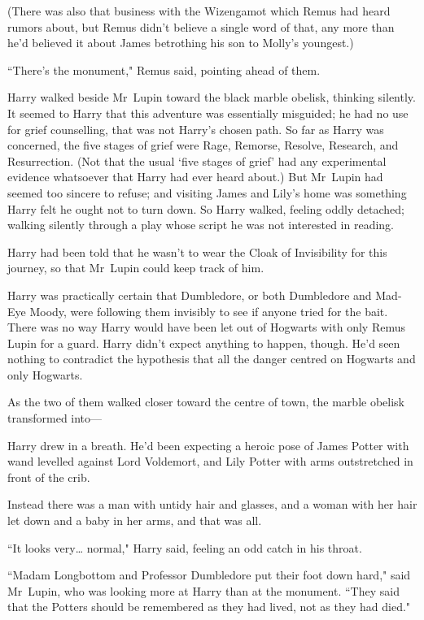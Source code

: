 (There was also that business with the Wizengamot which Remus had heard rumors about, but Remus didn't believe a single word of that, any more than he'd believed it about James betrothing his son to Molly's youngest.)

``There's the monument," Remus said, pointing ahead of them.

\later

Harry walked beside Mr~Lupin toward the black marble obelisk, thinking silently. It seemed to Harry that this adventure was essentially misguided; he had no use for grief counselling, that was not Harry's chosen path. So far as Harry was concerned, the five stages of grief were Rage, Remorse, Resolve, Research, and Resurrection. (Not that the usual `five stages of grief' had any experimental evidence whatsoever that Harry had ever heard about.) But Mr~Lupin had seemed too sincere to refuse; and visiting James and Lily's home was something Harry felt he ought not to turn down. So Harry walked, feeling oddly detached; walking silently through a play whose script he was not interested in reading.

Harry had been told that he wasn't to wear the Cloak of Invisibility for this journey, so that Mr~Lupin could keep track of him.

Harry was practically certain that Dumbledore, or both Dumbledore and Mad-Eye Moody, were following them invisibly to see if anyone tried for the bait. There was no way Harry would have been let out of Hogwarts with only Remus Lupin for a guard. Harry didn't expect anything to happen, though. He'd seen nothing to contradict the hypothesis that all the danger centred on Hogwarts and only Hogwarts.

As the two of them walked closer toward the centre of town, the marble obelisk transformed into—

Harry drew in a breath. He'd been expecting a heroic pose of James Potter with wand levelled against Lord Voldemort, and Lily Potter with arms outstretched in front of the crib.

Instead there was a man with untidy hair and glasses, and a woman with her hair let down and a baby in her arms, and that was all.

``It looks very{\ldots} normal," Harry said, feeling an odd catch in his throat.

``Madam Longbottom and Professor Dumbledore put their foot down hard," said Mr~Lupin, who was looking more at Harry than at the monument. ``They said that the Potters should be remembered as they had lived, not as they had died."

